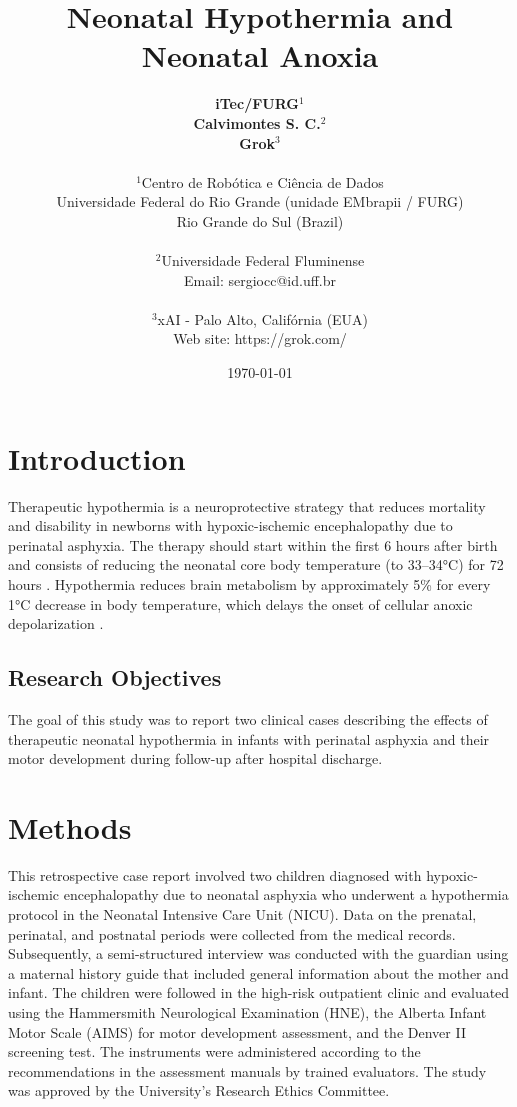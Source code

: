 \documentclass[11pt,a4paper]{article}
\title{\textbf{Neonatal Hypothermia and Neonatal Anoxia}}
\author{
	\textbf{iTec/FURG}$^{1}$ \\
	\textbf{Calvimontes S. C.}$^{2}$ \\
	\textbf{Grok}$^{3}$ \\
	\\
	\small $^{1}$Centro de Robótica e Ciência de Dados \\
	\small Universidade Federal do Rio Grande (unidade EMbrapii / FURG) \\
	\small Rio Grande do Sul (Brazil) \\
	\\
	\small $^{2}$Universidade Federal Fluminense \\
	\small Email: sergiocc@id.uff.br \\
	\\
	\small $^{3}$xAI - Palo Alto, Califórnia (EUA) \\
	\small Web site: https://grok.com/
}
\date{\today}
\begin{document}
	
	\maketitle
	
	\newpage
	
	\section{Introduction}
	Therapeutic hypothermia is a neuroprotective strategy that reduces mortality and disability in newborns with hypoxic-ischemic encephalopathy due to perinatal asphyxia. The therapy should start within the first 6 hours after birth and consists of reducing the neonatal core body temperature (to 33--34°C) for 72 hours \cite{Azzopardi2014,Thayyil2021,Abate2021}. Hypothermia reduces brain metabolism by approximately 5\% for every 1°C decrease in body temperature, which delays the onset of cellular anoxic depolarization \cite{Silveira2015}.
		
	\subsection{Research Objectives}
	The goal of this study was to report two clinical cases describing the effects of therapeutic neonatal hypothermia in infants with perinatal asphyxia and their motor development during follow-up after hospital discharge.
	
	\section{Methods}
	This retrospective case report involved two children diagnosed with hypoxic-ischemic encephalopathy due to neonatal asphyxia who underwent a hypothermia protocol in the Neonatal Intensive Care Unit (NICU). Data on the prenatal, perinatal, and postnatal periods were collected from the medical records. Subsequently, a semi-structured interview was conducted with the guardian using a maternal history guide that included general information about the mother and infant. The children were followed in the high-risk outpatient clinic and evaluated using the Hammersmith Neurological Examination (HNE), the Alberta Infant Motor Scale (AIMS) for motor development assessment, and the Denver II screening test. The instruments were administered according to the recommendations in the assessment manuals by trained evaluators. The study was approved by the University's Research Ethics Committee.
	
\end{document}
